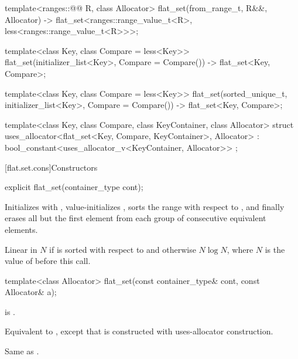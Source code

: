 \begin{codeblock}
{   template<ranges::@@ R, class Allocator>
     flat_set(from_range_t, R&&, Allocator)
       -> flat_set<ranges::range_value_t<R>, less<ranges::range_value_t<R>>>;

  template<class Key, class Compare = less<Key>>
    flat_set(initializer_list<Key>, Compare = Compare())
      -> flat_set<Key, Compare>;

  template<class Key, class Compare = less<Key>>
    flat_set(sorted_unique_t, initializer_list<Key>, Compare = Compare())
      -> flat_set<Key, Compare>;

  template<class Key, class Compare, class KeyContainer, class Allocator>
    struct uses_allocator<flat_set<Key, Compare, KeyContainer>, Allocator>
      : bool_constant<uses_allocator_v<KeyContainer, Allocator>> { };
}
\end{codeblock}

[flat.set.cons]{Constructors}

%
\begin{itemdecl}
explicit flat_set(container_type cont);
\end{itemdecl}

\begin{itemdescr}
\pnum
\effects
Initializes  with ,
value-initializes ,
sorts the range  with respect to , and
finally erases all but the first element
from each group of consecutive equivalent elements.

\pnum
\complexity
Linear in $N$ if  is sorted with respect to  and
otherwise $N \log N$, where $N$ is the value of  before this call.
\end{itemdescr}

%
\begin{itemdecl}
template<class Allocator>
  flat_set(const container_type& cont, const Allocator& a);
\end{itemdecl}

\begin{itemdescr}
\pnum
\constraints
{} is .

\pnum
\effects
Equivalent to ,
except that  is constructed with
uses-allocator construction.

\pnum
\complexity
Same as .
\end{itemdescr}

